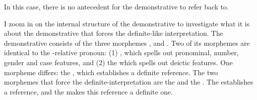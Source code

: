 In this case, there is no antecedent for the demonstrative  to refer back to.


I zoom in on the internal structure of the demonstrative  to investigate what it is about the demonstrative that forces the definite-like interpretation. The demonstrative consists of the three morphemes ,  and . Two of its morphemes are identical to the -relative pronoun: (1) , which spells out pronominal, number, gender and case features, and (2) the  which spells out deictic features. One morpheme differs: the , which establishes a definite reference. The two morphemes that force the definite-interpretation are the  and the . The  establishes a reference, and the  makes this reference a definite one.


